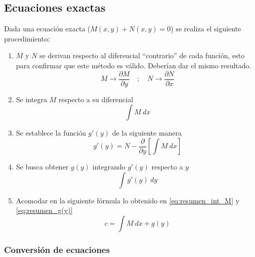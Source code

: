 \subsection{Ecuaciones exactas}

Dada una ecuación exacta ($M(x,y) + N(x,y) = 0 $) se realiza el siguiente procedimiento:

\begin{enumerate}
    \item $M$ y $N$ se derivan respecto al diferencial ``contrario'' de cada función, esto para confirmar que este método es válido. Deberían dar el mismo resultado.
        \begin{equation*}
            M \longrightarrow \frac{\partial M}{\partial y} \quad ; \quad N \longrightarrow \frac{\partial N}{\partial x}
        \end{equation*}
        
    \item Se integra $M$ respecto a su diferencial
        \begin{equation}\label{eq:resumen_int_M}
            \int{M} \ dx
        \end{equation}
        
    \item Se establece la función $g'(y)$ de la siguiente manera
        \begin{equation*}
            g'(y) = N - \frac{\partial}{\partial y} \left[ \int{M} \ dx \right]
        \end{equation*}
        
    \item Se busca obtener $g(y)$ integrando $g'(y)$ respecto a $y$
        \begin{equation}\label{eq:resumen_g(y)}
            \int{g'(y) \ dy}
        \end{equation}
        
    \item Acomodar en la siguiente fórmula lo obtenido en \autoref{eq:resumen_int_M} y \autoref{eq:resumen_g(y)}
        \begin{equation}
            c = \int{M} \ dx + g(y)
        \end{equation}
\end{enumerate}

\subsubsection{Conversión de ecuaciones}

